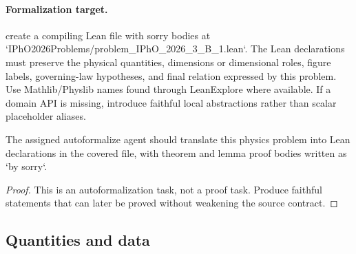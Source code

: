 \paragraph{Formalization target.}
create a compiling Lean file with sorry bodies at `IPhO2026Problems/problem\_IPhO\_2026\_3\_B\_1.lean`.
The Lean declarations must preserve the physical quantities, dimensions or dimensional roles, figure labels, governing-law hypotheses, and final relation expressed by this problem.
Use Mathlib/Physlib names found through LeanExplore where available. If a domain API is missing, introduce faithful local abstractions rather than scalar placeholder aliases.

\begin{theorem}
\label{thm:physics:IPhO_2026_3_B_1:target}
The assigned autoformalize agent should translate this physics problem into Lean declarations in the covered file, with theorem and lemma proof bodies written as `by sorry`.
\end{theorem}
\begin{proof}
This is an autoformalization task, not a proof task. Produce faithful statements that can later be proved without weakening the source contract.
\end{proof}

\subsection*{Quantities and data}

